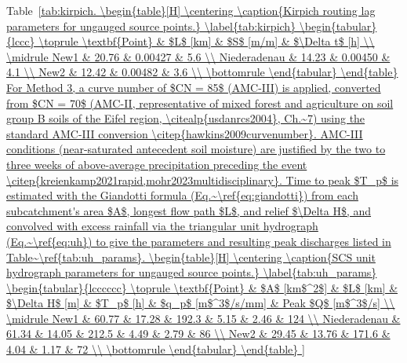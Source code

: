 \documentclass[12pt,a4paper]{report}
\begin{document}
Table~\ref{tab:kirpich.
 
\begin{table}[H]
    \centering
    \caption{Kirpich routing lag parameters for ungauged source points.}
    \label{tab:kirpich}
    \begin{tabular}{lccc}
        \toprule
        \textbf{Point} & $L$ [km] & $S$ [m/m] & $\Delta t$ [h] \\
        \midrule
        New1         & 20.76 & 0.00427 & 5.6 \\
        Niederadenau & 14.23 & 0.00450 & 4.1 \\
        New2         & 12.42 & 0.00482 & 3.6 \\
        \bottomrule
    \end{tabular}
\end{table}
 
For Method 3, a curve number of $CN = 85$ (AMC-III) is applied, converted from $CN =
70$ (AMC-II, representative of mixed forest and agriculture on soil group B soils of
the Eifel region, \citealp{usdanrcs2004}, Ch.~7) using the standard AMC-III conversion
\citep{hawkins2009curvenumber}. AMC-III conditions (near-saturated antecedent soil moisture)
are justified by the two to three weeks of above-average precipitation preceding the
event \citep{kreienkamp2021rapid,mohr2023multidisciplinary}. Time to peak $T_p$ is estimated
with the Giandotti formula (Eq.~\ref{eq:giandotti}) from each subcatchment's area $A$,
longest flow path $L$, and relief $\Delta H$, and convolved with excess rainfall via
the triangular unit hydrograph (Eq.~\ref{eq:uh}) to give the parameters and resulting
peak discharges listed in Table~\ref{tab:uh_params}.
 
\begin{table}[H]
    \centering
    \caption{SCS unit hydrograph parameters for ungauged source points.}
    \label{tab:uh_params}
    \begin{tabular}{lcccccc}
        \toprule
        \textbf{Point} & $A$ [km$^2$] & $L$ [km] & $\Delta H$ [m] & $T_p$ [h] &
        $q_p$ [m$^3$/s/mm] & Peak $Q$ [m$^3$/s] \\
        \midrule
        New1         & 60.77 & 17.28 & 192.3 & 5.15 & 2.46 & 124 \\
        Niederadenau & 61.34 & 14.05 & 212.5 & 4.49 & 2.79 &  86 \\
        New2         & 29.45 & 13.76 & 171.6 & 4.04 & 1.17 &  72 \\
        \bottomrule
    \end{tabular}
\end{table}
 
}
\end{document}
